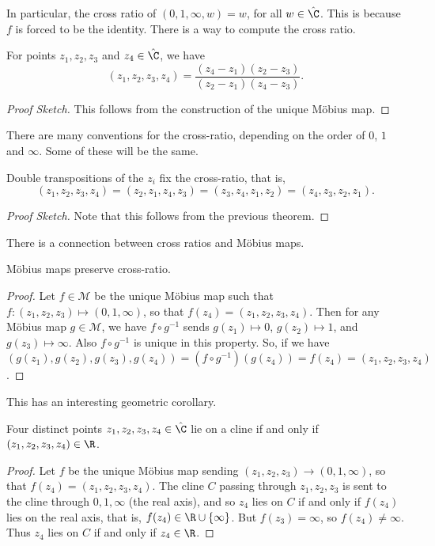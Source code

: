 \documentclass[a4]{scrreprt}
\begin{document}
In particular, the cross ratio of $(0, 1, \infty, w) = w$, for all $w \in \hat{\C}$. This is because $f$ is forced to be the identity. There is a way to compute the cross ratio.

\begin{theorem}
For points $z_1, z_2, z_3$ and $z_4 \in \hat{\C}$, we have
$$
(z_1, z_2 , z_3, z_4) = \frac{(z_4 - z_1)(z_2 - z_3)}{(z_2 - z_1)(z_4 - z_3)}.
$$
\end{theorem}
\begin{proof}[Proof Sketch]
This follows from the construction of the unique Möbius map.
\end{proof}

\begin{remark}
	There are many conventions for the cross-ratio, depending on the order of $0$, $1$ and $\infty$. Some of these will be the same.
\end{remark}

\begin{proposition}
	Double transpositions of the $z_i$ fix the cross-ratio, that is,
	$$
	(z_1, z_2, z_3, z_4) = (z_2, z_1, z_4, z_3) = (z_3, z_4, z_1, z_2) = (z_4, z_3, z_2, z_1).
	$$
\end{proposition}
\begin{proof}[Proof Sketch]
	Note that this follows from the previous theorem.
\end{proof}

There is a connection between cross ratios and Möbius maps.

\begin{theorem}
	Möbius maps preserve cross-ratio.
\end{theorem}
\begin{proof}
	Let $f \in \mathcal{M}$ be the unique Möbius map such that $f:(z_1, z_2, z_3) \mapsto (0, 1, \infty)$, so that $f(z_4) = (z_1, z_2, z_3, z_4)$. Then for any Möbius map $g \in \mathcal{M}$, we have $f \circ g^{-1}$ sends $g(z_1) \mapsto 0$, $g(z_2) \mapsto 1$, and $g(z_3) \mapsto \infty$. Also $f \circ g^{-1}$ is unique in this property. So, if we have $(g(z_1), g(z_2), g(z_3), g(z_4)) = (f \circ g^{-1})(g(z_4)) = f(z_4) = (z_1, z_2, z_3, z_4)$.
\end{proof}

This has an interesting geometric corollary.

\begin{theorem}
	Four distinct points $z_1, z_2, z_3, z_4 \in \hat{\C}$ lie on a cline if and only if
	$(z_1, z_2, z_3, z_4) \in \R$.
\end{theorem}
\begin{proof}
	Let $f$ be the unique Möbius map sending $(z_1, z_2, z_3) \rightarrow (0, 1, \infty)$, so that $f(z_4) = (z_1, z_2, z_3, z_4)$. The cline $C$ passing through $z_1, z_2, z_3$ is sent to the cline through $0, 1, \infty$ (the real axis), and so $z_4$ lies on $C$ if and only if $f(z_4)$ lies on the real axis, that is, $f(z_4) \in \R \cup \{\infty\}$. But $f(z_3) = \infty$, so $f(z_4) \neq \infty$. Thus $z_4$ lies on $C$ if and only if $z_4 \in \R$. 
\end{proof}
\end{document}
